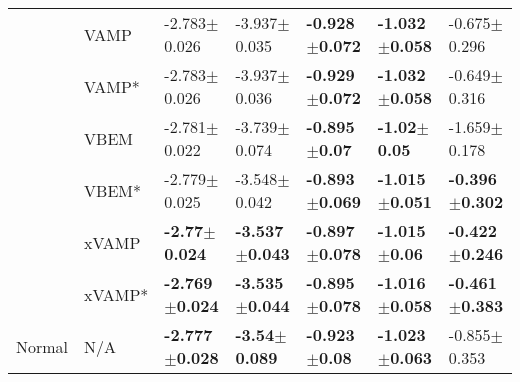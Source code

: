 \begin{tabular}{lllllll}
       & VAMP &           -2.783$\pm$0.026 &           -3.937$\pm$0.035 &  \textbf{-0.928$\pm$0.072} &  \textbf{-1.032$\pm$0.058} &           -0.675$\pm$0.296 \\
       & VAMP* &           -2.783$\pm$0.026 &           -3.937$\pm$0.036 &  \textbf{-0.929$\pm$0.072} &  \textbf{-1.032$\pm$0.058} &           -0.649$\pm$0.316 \\
       & VBEM &           -2.781$\pm$0.022 &           -3.739$\pm$0.074 &   \textbf{-0.895$\pm$0.07} &    \textbf{-1.02$\pm$0.05} &           -1.659$\pm$0.178 \\
       & VBEM* &           -2.779$\pm$0.025 &           -3.548$\pm$0.042 &  \textbf{-0.893$\pm$0.069} &  \textbf{-1.015$\pm$0.051} &  \textbf{-0.396$\pm$0.302} \\
       & xVAMP &   \textbf{-2.77$\pm$0.024} &  \textbf{-3.537$\pm$0.043} &  \textbf{-0.897$\pm$0.078} &   \textbf{-1.015$\pm$0.06} &  \textbf{-0.422$\pm$0.246} \\
       & xVAMP* &  \textbf{-2.769$\pm$0.024} &  \textbf{-3.535$\pm$0.044} &  \textbf{-0.895$\pm$0.078} &  \textbf{-1.016$\pm$0.058} &  \textbf{-0.461$\pm$0.383} \\
Normal & N/A &  \textbf{-2.777$\pm$0.028} &   \textbf{-3.54$\pm$0.089} &   \textbf{-0.923$\pm$0.08} &  \textbf{-1.023$\pm$0.063} &           -0.855$\pm$0.353 \\
\bottomrule
\end{tabular}

